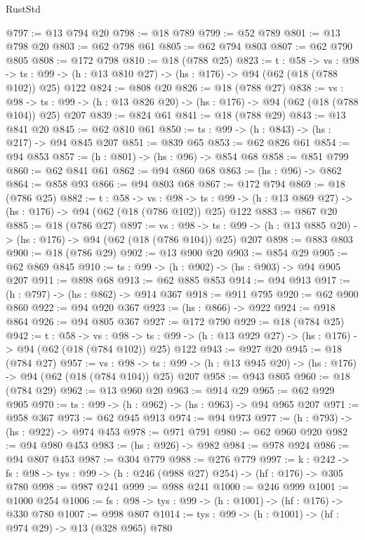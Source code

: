\begin{lexlean}{RustStd}
\begin{coremodule}
{\begin{coremodule}
{{{{{{@797 := @13 @794 @20
@798 := @18 @789
@799 := @52 @789
@801 := @13 @798 @20
@803 := @62 @798 @61
@805 := @62 @794 @803
@807 := @62 @790 @805
@808 := @172 @798
@810 := @18 (@788 @25)
@823 := {t : @58} ->
  {vs : @98} ->
  {ts : @99} -> (h : @13 @810 @27) -> (hs : @176) -> @94 (@62 (@18 (@788 @102)) @25) @122
@824 := @808 @20
@826 := @18 (@788 @27)
@838 := {vs : @98} ->
  {ts : @99} -> (h : @13 @826 @20) -> (hs : @176) -> @94 (@62 (@18 (@788 @104)) @25) @207
@839 := @824 @61
@841 := @18 (@788 @29)
@843 := @13 @841 @20
@845 := @62 @810 @61
@850 := {ts : @99} -> (h : @843) -> (hs : @217) -> @94 @845 @207
@851 := @839 @65
@853 := @62 @826 @61
@854 := @94 @853
@857 := (h : @801) -> (hs : @96) -> @854 @68
@858 := @851 @799
@860 := @62 @841 @61
@862 := @94 @860 @68
@863 := (hs : @96) -> @862
@864 := @858 @93
@866 := @94 @803 @68
@867 := @172 @794
@869 := @18 (@786 @25)
@882 := {t : @58} ->
  {vs : @98} ->
  {ts : @99} -> (h : @13 @869 @27) -> (hs : @176) -> @94 (@62 (@18 (@786 @102)) @25) @122
@883 := @867 @20
@885 := @18 (@786 @27)
@897 := {vs : @98} ->
  {ts : @99} -> (h : @13 @885 @20) -> (hs : @176) -> @94 (@62 (@18 (@786 @104)) @25) @207
@898 := @883 @803
@900 := @18 (@786 @29)
@902 := @13 @900 @20
@903 := @854 @29
@905 := @62 @869 @845
@910 := {ts : @99} -> (h : @902) -> (hs : @903) -> @94 @905 @207
@911 := @898 @68
@913 := @62 @885 @853
@914 := @94 @913
@917 := (h : @797) -> (hs : @862) -> @914 @367
@918 := @911 @795
@920 := @62 @900 @860
@922 := @94 @920 @367
@923 := (hs : @866) -> @922
@924 := @918 @864
@926 := @94 @805 @367
@927 := @172 @790
@929 := @18 (@784 @25)
@942 := {t : @58} ->
  {vs : @98} ->
  {ts : @99} -> (h : @13 @929 @27) -> (hs : @176) -> @94 (@62 (@18 (@784 @102)) @25) @122
@943 := @927 @20
@945 := @18 (@784 @27)
@957 := {vs : @98} ->
  {ts : @99} -> (h : @13 @945 @20) -> (hs : @176) -> @94 (@62 (@18 (@784 @104)) @25) @207
@958 := @943 @805
@960 := @18 (@784 @29)
@962 := @13 @960 @20
@963 := @914 @29
@965 := @62 @929 @905
@970 := {ts : @99} -> (h : @962) -> (hs : @963) -> @94 @965 @207
@971 := @958 @367
@973 := @62 @945 @913
@974 := @94 @973
@977 := (h : @793) -> (hs : @922) -> @974 @453
@978 := @971 @791
@980 := @62 @960 @920
@982 := @94 @980 @453
@983 := (hs : @926) -> @982
@984 := @978 @924
@986 := @94 @807 @453
@987 := @304 @779
@988 := @276 @779
@997 := {k : @242} ->
  {fs : @98} -> {tys : @99} -> (h : @246 (@988 @27) @254) -> (hf : @176) -> @305 @780
@998 := @987 @241
@999 := @988 @241
@1000 := @246 @999
@1001 := @1000 @254
@1006 := {fs : @98} -> {tys : @99} -> (h : @1001) -> (hf : @176) -> @330 @780
@1007 := @998 @807
@1014 := {tys : @99} -> (h : @1001) -> (hf : @974 @29) -> @13 (@328 @965) @780
}}}}}}
\end{coremodule}}
\end{coremodule}
\end{lexlean}
